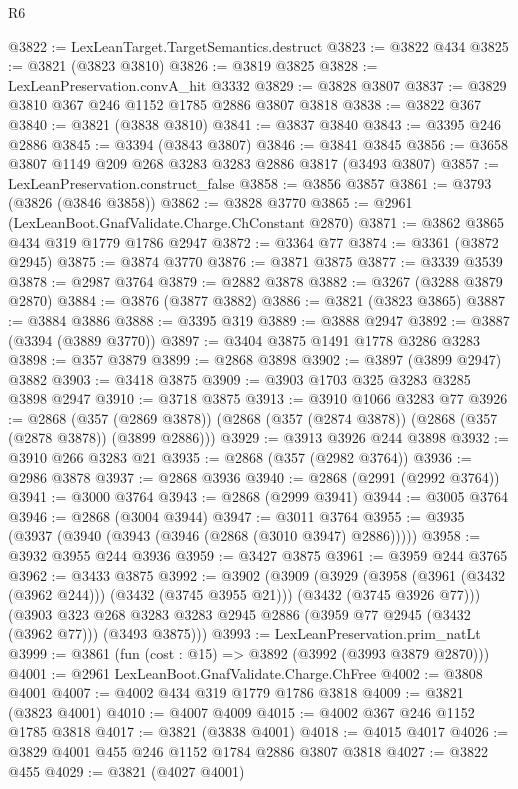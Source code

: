 \begin{lexlean}{R6}
\begin{coremodule}
{{{{{{{{{{{{{{{{{{{@3822 := LexLeanTarget.TargetSemantics.destruct
@3823 := @3822 @434
@3825 := @3821 (@3823 @3810)
@3826 := @3819 @3825
@3828 := LexLeanPreservation.convA_hit @3332
@3829 := @3828 @3807
@3837 := @3829 @3810 @367 @246 @1152 @1785 @2886 @3807 @3818
@3838 := @3822 @367
@3840 := @3821 (@3838 @3810)
@3841 := @3837 @3840
@3843 := @3395 @246 @2886
@3845 := @3394 (@3843 @3807)
@3846 := @3841 @3845
@3856 := @3658 @3807 @1149 @209 @268 @3283 @3283 @2886 @3817 (@3493 @3807)
@3857 := LexLeanPreservation.construct_false
@3858 := @3856 @3857
@3861 := @3793 (@3826 (@3846 @3858))
@3862 := @3828 @3770
@3865 := @2961 (LexLeanBoot.GnafValidate.Charge.ChConstant @2870)
@3871 := @3862 @3865 @434 @319 @1779 @1786 @2947
@3872 := @3364 @77
@3874 := @3361 (@3872 @2945)
@3875 := @3874 @3770
@3876 := @3871 @3875
@3877 := @3339 @3539
@3878 := @2987 @3764
@3879 := @2882 @3878
@3882 := @3267 (@3288 @3879 @2870)
@3884 := @3876 (@3877 @3882)
@3886 := @3821 (@3823 @3865)
@3887 := @3884 @3886
@3888 := @3395 @319
@3889 := @3888 @2947
@3892 := @3887 (@3394 (@3889 @3770))
@3897 := @3404 @3875 @1491 @1778 @3286 @3283
@3898 := @357 @3879
@3899 := @2868 @3898
@3902 := @3897 (@3899 @2947) @3882
@3903 := @3418 @3875
@3909 := @3903 @1703 @325 @3283 @3285 @3898 @2947
@3910 := @3718 @3875
@3913 := @3910 @1066 @3283 @77
@3926 := @2868
    (@357 (@2869 @3878))
    (@2868 (@357 (@2874 @3878)) (@2868 (@357 (@2878 @3878)) (@3899 @2886)))
@3929 := @3913 @3926 @244 @3898
@3932 := @3910 @266 @3283 @21
@3935 := @2868 (@357 (@2982 @3764))
@3936 := @2986 @3878
@3937 := @2868 @3936
@3940 := @2868 (@2991 (@2992 @3764))
@3941 := @3000 @3764
@3943 := @2868 (@2999 @3941)
@3944 := @3005 @3764
@3946 := @2868 (@3004 @3944)
@3947 := @3011 @3764
@3955 := @3935 (@3937 (@3940 (@3943 (@3946 (@2868 (@3010 @3947) @2886)))))
@3958 := @3932 @3955 @244 @3936
@3959 := @3427 @3875
@3961 := @3959 @244 @3765
@3962 := @3433 @3875
@3992 := @3902
    (@3909
      (@3929
        (@3958 (@3961 (@3432 (@3962 @244))) (@3432 (@3745 @3955 @21)))
        (@3432 (@3745 @3926 @77)))
      (@3903 @323 @268 @3283 @3283 @2945 @2886 (@3959 @77 @2945 (@3432 (@3962 @77))) (@3493 @3875)))
@3993 := LexLeanPreservation.prim_natLt
@3999 := @3861 (fun (cost : @15) => @3892 (@3992 (@3993 @3879 @2870)))
@4001 := @2961 LexLeanBoot.GnafValidate.Charge.ChFree
@4002 := @3808 @4001
@4007 := @4002 @434 @319 @1779 @1786 @3818
@4009 := @3821 (@3823 @4001)
@4010 := @4007 @4009
@4015 := @4002 @367 @246 @1152 @1785 @3818
@4017 := @3821 (@3838 @4001)
@4018 := @4015 @4017
@4026 := @3829 @4001 @455 @246 @1152 @1784 @2886 @3807 @3818
@4027 := @3822 @455
@4029 := @3821 (@4027 @4001)
}}}}}}}}}}}}}}}}}}}
\end{coremodule}
\end{lexlean}
